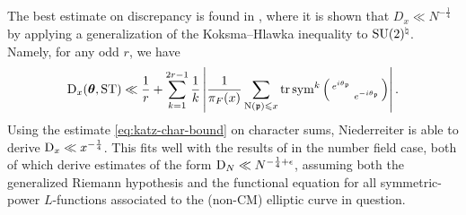The best estimate on discrepancy is found in 
\cite{niederreiter-1991}, where it is shown that $D_x \ll N^{-\frac 1 4}$ 
by applying a generalization of the Koksma--Hlawka inequality to 
$\operatorname{SU}(2)^\natural$. Namely, for any odd $r$, we have 
\[
	\operatorname{D}_x({\boldsymbol\theta},\mathrm{ST}) \ll \frac 1 r + \sum_{k=1}^{2 r -1} \frac 1 k \left| \frac{1}{\pi_F(x)} \sum_{\operatorname{N}(\mathfrak{p})\leqslant x} \operatorname{tr}\operatorname{sym}^k\left(\begin{smallmatrix} e^{i \theta_{\mathfrak{p}}} &  \\  & e^{- i \theta_{\mathfrak{p}}} \end{smallmatrix}\right)\right| .
\]
Using the estimate \eqref{eq:katz-char-bound} on character sums, Niederreiter 
is able to derive $\operatorname{D}_x \ll x^{-\frac 1 4}$. This fits well with the results of 
\cite{bucar-kedlaya-2015,rouse-thorner-2016} in the number field case, both of 
which derive estimates of the form $\operatorname{D}_N \ll N^{-\frac 1 4+\epsilon}$, assuming 
both the generalized Riemann hypothesis and the functional equation for all 
symmetric-power $L$-functions associated to the (non-CM) elliptic curve in 
question. 
